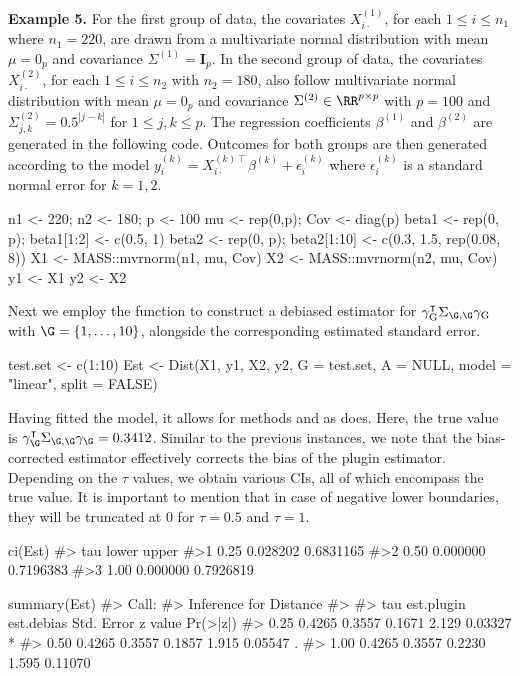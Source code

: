\noindent\textbf{Example 5.} 
For the first group of data, the covariates $X_{i\cdot}^{(1)}$, for each $1 \leq i \leq n_1$ where $n_1 = 220$, are drawn from a multivariate normal distribution with mean $\mu = 0_p$ and covariance $\Sigma^{(1)}=\mathbf{I}_p$. In the second group of data, the covariates $X_{i\cdot}^{(2)}$, for each $1 \leq i \leq n_2$ with $n_2 = 180$, also follow multivariate normal distribution with mean $\mu=0_p$ and covariance $\Sigma^{(2)} \in \RR^{p\times p}$ with $p = 100$ and $\Sigma^{(2)}_{j,k} = 0.5^{|j-k|}$ for $1 \leq j, k \leq p$. The regression coefficients $\beta^{(1)}$ and $\beta^{(2)}$ are generated in the following code. Outcomes for both groups are then generated according to the model $y_i^{(k)} = X_{i\cdot}^{(k)\intercal}\beta^{(k)} + \epsilon_i^{(k)}$ where $\epsilon_i^{(k)}$ is a standard normal error for $k=1,2$.
\begin{example}
    n1 <- 220; n2 <- 180; p <- 100
    mu <- rep(0,p); Cov <- diag(p)
    beta1 <- rep(0, p); beta1[1:2] <- c(0.5, 1)
    beta2 <- rep(0, p); beta2[1:10] <- c(0.3, 1.5, rep(0.08, 8))
    X1 <- MASS::mvrnorm(n1, mu, Cov)
    X2 <- MASS::mvrnorm(n2, mu, Cov)
    y1 <- X1%
    y2 <- X2%
\end{example}
{Next we employ the  function to construct a debiased estimator for $\gamma_{\textrm{G}}^\intercal\Sigma_{\G,\G}\gamma_{\textrm{G}}$ with $\G = \{1, \ldots, 10\}$, alongside the corresponding estimated standard error.}
\begin{example}
    test.set <- c(1:10)
    Est <- Dist(X1, y1, X2, y2, G = test.set, A = NULL, model = "linear", split = FALSE)
\end{example}
Having fitted the model, it allows for methods  and  as  does. Here, the true value is $\gamma_\G^\intercal \Sigma_{\G, \G} \gamma_\G = 0.3412$. Similar to the previous instances, we note that the bias-corrected estimator effectively corrects the bias of the plugin estimator. Depending on the $\tau$ values, we obtain various CIs, all of which encompass the true value. It is important to mention that in case of negative lower boundaries, they will be truncated at $0$ for $\tau=0.5$ and $\tau=1$.
\begin{example}
    ci(Est)
    #>   tau    lower     upper
    #>1 0.25 0.028202 0.6831165
    #>2 0.50 0.000000 0.7196383
    #>3 1.00 0.000000 0.7926819

    summary(Est)
    #> Call: 
    #> Inference for Distance
    #> 
    #>  tau est.plugin est.debias Std. Error z value Pr(>|z|)  
    #> 0.25     0.4265     0.3557     0.1671   2.129  0.03327 *
    #> 0.50     0.4265     0.3557     0.1857   1.915  0.05547 .
    #> 1.00     0.4265     0.3557     0.2230   1.595  0.11070  
\end{example}

